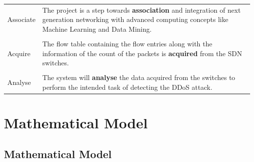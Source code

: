 \documentclass[12pt,a4paper,final]{report}
\DeclareRobustCommand{\gobblefive}[5]{}
\newcommand*{\SkipTocEntry}{\addtocontents{toc}{\gobblefive}}
\begin{document}
\vspace*{1cm}
\begin{center}
\begin{tabular}{|m{2cm}|m{7cm}|}
\hline

Associate & The project is a step towards \textbf{association} and integration of next generation networking with advanced computing concepts like Machine Learning and Data Mining. \\

&\\

Acquire & The flow table containing the flow entries along with the information of the count of the packets is \textbf{acquired} from the SDN switches. \\

&\\

Analyse & The system will \textbf{analyse} the data acquired from the switches to perform the intended task of detecting the DDoS attack. \\

\hline
\end{tabular}
\end{center}
\newpage
\SkipTocEntry\section{Mathematical Model}
\SkipTocEntry\subsection{Mathematical Model}
\end{document}
